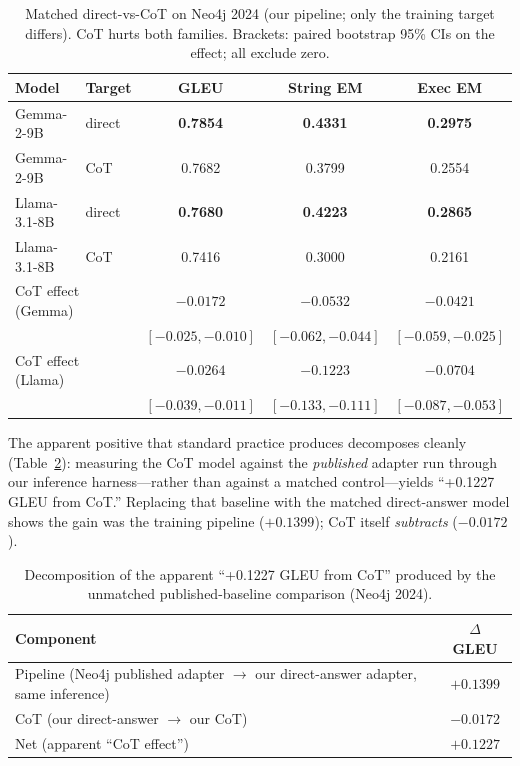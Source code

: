 \documentclass[11pt]{article}
\begin{document}
\begin{table}[t]\centering
\caption{Matched direct-vs-CoT on Neo4j 2024 (our pipeline; only the training target differs).
CoT hurts both families. Brackets: paired bootstrap 95\% CIs on the effect; all exclude zero.}
\label{tab:matched}
\small
\begin{tabular}{llccc}
\toprule
Model & Target & GLEU & String EM & Exec EM \\
\midrule
Gemma-2-9B & direct & \textbf{0.7854} & \textbf{0.4331} & \textbf{0.2975} \\
Gemma-2-9B & CoT    & 0.7682 & 0.3799 & 0.2554 \\
\addlinespace
Llama-3.1-8B & direct & \textbf{0.7680} & \textbf{0.4223} & \textbf{0.2865} \\
Llama-3.1-8B & CoT    & 0.7416 & 0.3000 & 0.2161 \\
\midrule
\multicolumn{2}{l}{CoT effect (Gemma)} & $-0.0172$ & $-0.0532$ & $-0.0421$ \\
& & {\scriptsize$[-0.025, -0.010]$} & {\scriptsize$[-0.062, -0.044]$} & {\scriptsize$[-0.059, -0.025]$} \\
\multicolumn{2}{l}{CoT effect (Llama)} & $-0.0264$ & $-0.1223$ & $-0.0704$ \\
& & {\scriptsize$[-0.039, -0.011]$} & {\scriptsize$[-0.133, -0.111]$} & {\scriptsize$[-0.087, -0.053]$} \\
\bottomrule
\end{tabular}
\end{table}

The apparent positive that standard practice produces decomposes cleanly (Table~\ref{tab:decomp}):
measuring the CoT model against the \emph{published} adapter run through our inference
harness---rather than against a matched control---yields ``+0.1227 GLEU from CoT.'' Replacing that
baseline with the matched direct-answer model shows the gain was the training pipeline ($+0.1399$);
CoT itself \emph{subtracts} ($-0.0172$).

\begin{table}[t]\centering
\caption{Decomposition of the apparent ``+0.1227 GLEU from CoT'' produced by the unmatched
published-baseline comparison (Neo4j 2024).}
\label{tab:decomp}
\begin{tabular}{lc}
\toprule
Component & $\Delta$ GLEU \\
\midrule
Pipeline (Neo4j published adapter $\to$ our direct-answer adapter, same inference) & $+0.1399$ \\
CoT (our direct-answer $\to$ our CoT) & $-0.0172$ \\
\midrule
Net (apparent ``CoT effect'') & $+0.1227$ \\
\bottomrule
\end{tabular}
\end{table}
\end{document}

